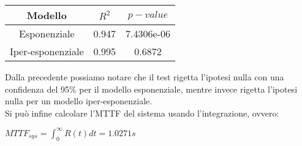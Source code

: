\begin{table}[htbp]
    \centering
    \label{tab:esempio}
    \begin{tabular}{|c|c|c|} %
        \hline
        Modello & $R^2$ & $p-value$ \\ %
        \hline
        Esponenziale & 0.947 &  7.4306e-06\\
        Iper-esponenziale & 0.995 &  0.6872\\
        \hline
    \end{tabular}
\end{table}
\noindent
Dalla precedente possiamo notare che il test rigetta l'ipotesi nulla con una confidenza del 95\% per il modello esponenziale, mentre invece rigetta l'ipotesi nulla per un modello iper-esponenziale.\\
Si può infine calcolare l'MTTF del sistema usando l'integrazione, ovvero:
\begin{center}
$MTTF_{sys} = \int_{0}^{\infty} R(t) dt = 1.0271s$
\end{center}
